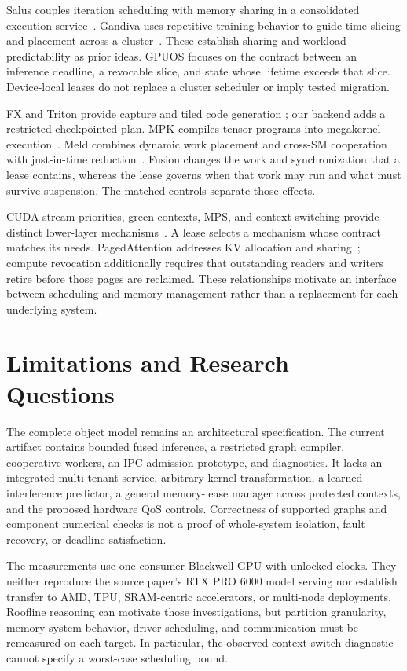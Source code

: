 Salus couples iteration scheduling with memory sharing in a consolidated
execution service~\cite{Yu2020Salus}. Gandiva uses repetitive training behavior
to guide time slicing and placement across a cluster~\cite{Xiao2018Gandiva}.
These establish sharing and workload predictability as prior ideas. GPUOS
focuses on the contract between an inference deadline, a revocable slice,
and state whose lifetime exceeds that slice. Device-local leases do not
replace a cluster scheduler or imply tested migration.

FX and Triton provide capture and tiled code generation
\cite{Reed2022FX,Tillet2019Triton}; our backend adds a restricted checkpointed
plan. MPK compiles tensor programs into megakernel execution~\cite{Cheng2026MPK}.
Meld combines dynamic work placement and cross-SM cooperation with just-in-time
reduction~\cite{He2026Meld}. Fusion changes the work and synchronization that
a lease contains, whereas the lease governs when that work may run and what
must survive suspension. The matched controls separate those effects.

CUDA stream priorities, green contexts, MPS, and context switching provide
distinct lower-layer mechanisms~\cite{CUDAStreams,CUDAGreen,NVIDIAMPS,CUDAComputePreemption}.
A lease selects a mechanism whose contract matches its needs. PagedAttention
addresses KV allocation and sharing~\cite{Kwon2023PagedAttention}; compute
revocation additionally requires that outstanding readers and writers retire
before those pages are reclaimed. These relationships motivate an interface
between scheduling and memory management rather than a replacement for each
underlying system.

\section{Limitations and Research Questions}
\label{sec:limits}
The complete object model remains an architectural specification. The current
artifact contains bounded fused inference, a restricted graph compiler,
cooperative workers, an IPC admission prototype, and diagnostics. It lacks
an integrated multi-tenant service, arbitrary-kernel transformation, a learned
interference predictor, a general memory-lease manager across protected
contexts, and the proposed hardware QoS controls. Correctness of supported
graphs and component numerical checks is not a proof of whole-system
isolation, fault recovery, or deadline satisfaction.

The measurements use one consumer Blackwell GPU with unlocked clocks.
They neither reproduce the source paper's RTX PRO 6000 model serving nor
establish transfer to AMD, TPU, SRAM-centric accelerators, or multi-node
deployments. Roofline reasoning can motivate those investigations, but
partition granularity, memory-system behavior, driver scheduling, and
communication must be remeasured on each target. In particular, the observed
context-switch diagnostic cannot specify a worst-case scheduling bound.

